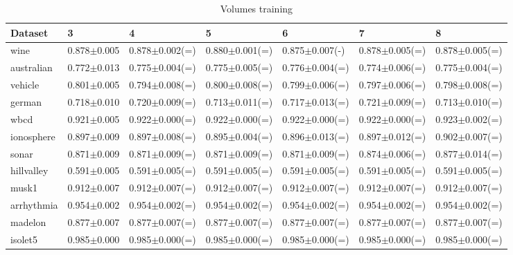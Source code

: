 \documentclass{report}
\begin{document}
\begin{table}
\centering
\scriptsize
\begin{tabular}{lllllll}
\\\hline
Dataset & 3 & 4 & 5 & 6 & 7 & 8\\\hline
wine & 0.878$\pm$0.005 & 0.878$\pm$0.002(=) & 0.880$\pm$0.001(=) & 0.875$\pm$0.007(-) & 0.878$\pm$0.005(=) & 0.878$\pm$0.005(=)\\\hline
australian & 0.772$\pm$0.013 & 0.775$\pm$0.004(=) & 0.775$\pm$0.005(=) & 0.776$\pm$0.004(=) & 0.774$\pm$0.006(=) & 0.775$\pm$0.004(=)\\\hline
vehicle & 0.801$\pm$0.005 & 0.794$\pm$0.008(=) & 0.800$\pm$0.008(=) & 0.799$\pm$0.006(=) & 0.797$\pm$0.006(=) & 0.798$\pm$0.008(=)\\\hline
german & 0.718$\pm$0.010 & 0.720$\pm$0.009(=) & 0.713$\pm$0.011(=) & 0.717$\pm$0.013(=) & 0.721$\pm$0.009(=) & 0.713$\pm$0.010(=)\\\hline
wbcd & 0.921$\pm$0.005 & 0.922$\pm$0.000(=) & 0.922$\pm$0.000(=) & 0.922$\pm$0.000(=) & 0.922$\pm$0.000(=) & 0.923$\pm$0.002(=)\\\hline
ionosphere & 0.897$\pm$0.009 & 0.897$\pm$0.008(=) & 0.895$\pm$0.004(=) & 0.896$\pm$0.013(=) & 0.897$\pm$0.012(=) & 0.902$\pm$0.007(=)\\\hline
sonar & 0.871$\pm$0.009 & 0.871$\pm$0.009(=) & 0.871$\pm$0.009(=) & 0.871$\pm$0.009(=) & 0.874$\pm$0.006(=) & 0.877$\pm$0.014(=)\\\hline
hillvalley & 0.591$\pm$0.005 & 0.591$\pm$0.005(=) & 0.591$\pm$0.005(=) & 0.591$\pm$0.005(=) & 0.591$\pm$0.005(=) & 0.591$\pm$0.005(=)\\\hline
musk1 & 0.912$\pm$0.007 & 0.912$\pm$0.007(=) & 0.912$\pm$0.007(=) & 0.912$\pm$0.007(=) & 0.912$\pm$0.007(=) & 0.912$\pm$0.007(=)\\\hline
arrhythmia & 0.954$\pm$0.002 & 0.954$\pm$0.002(=) & 0.954$\pm$0.002(=) & 0.954$\pm$0.002(=) & 0.954$\pm$0.002(=) & 0.954$\pm$0.002(=)\\\hline
madelon & 0.877$\pm$0.007 & 0.877$\pm$0.007(=) & 0.877$\pm$0.007(=) & 0.877$\pm$0.007(=) & 0.877$\pm$0.007(=) & 0.877$\pm$0.007(=)\\\hline
isolet5 & 0.985$\pm$0.000 & 0.985$\pm$0.000(=) & 0.985$\pm$0.000(=) & 0.985$\pm$0.000(=) & 0.985$\pm$0.000(=) & 0.985$\pm$0.000(=)\\\hline
\end{tabular}
\caption{Volumes training}
\end{table}
\end{document}
